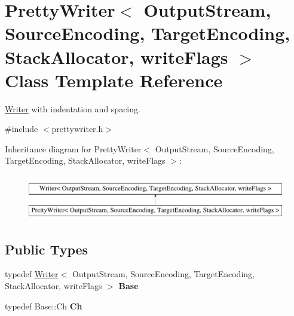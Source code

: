 \hypertarget{classPrettyWriter}{}\section{Pretty\+Writer$<$ Output\+Stream, Source\+Encoding, Target\+Encoding, Stack\+Allocator, write\+Flags $>$ Class Template Reference}
\label{classPrettyWriter}


\hyperlink{classWriter}{Writer} with indentation and spacing.  




{\ttfamily \#include $<$prettywriter.\+h$>$}

Inheritance diagram for Pretty\+Writer$<$ Output\+Stream, Source\+Encoding, Target\+Encoding, Stack\+Allocator, write\+Flags $>$\+:\begin{figure}[H]
\begin{center}
\leavevmode
\includegraphics[height=2.000000cm]{classPrettyWriter}
\end{center}
\end{figure}
\subsection*{Public Types}
\begin{DoxyCompactItemize}
\item 
typedef \hyperlink{classWriter}{Writer}$<$ Output\+Stream, Source\+Encoding, Target\+Encoding, Stack\+Allocator, write\+Flags $>$ {\bfseries Base}\hypertarget{classPrettyWriter_a6eecc5c896dcdaffca739dcd39d13a17}{}\label{classPrettyWriter_a6eecc5c896dcdaffca739dcd39d13a17}

\item 
typedef Base\+::\+Ch {\bfseries Ch}\hypertarget{classPrettyWriter_ae35c89bda4c5d59d3ff6efcf2fea45a3}{}\label{classPrettyWriter_ae35c89bda4c5d59d3ff6efcf2fea45a3}

\end{DoxyCompactItemize}
